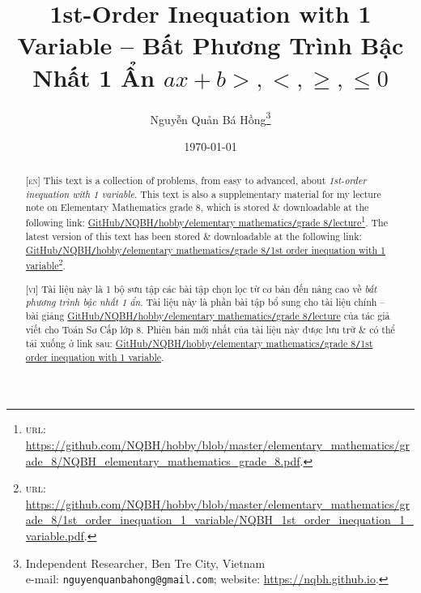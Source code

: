 \documentclass{article}
\title{1st-Order Inequation with 1 Variable -- Bất Phương Trình Bậc Nhất 1 Ẩn $ax + b >,<,\ge,\le0$}
\author{Nguyễn Quản Bá Hồng\footnote{Independent Researcher, Ben Tre City, Vietnam\\e-mail: \texttt{nguyenquanbahong@gmail.com}; website: \url{https://nqbh.github.io}.}}
\date{\today}
\begin{document}
\maketitle
\begin{abstract}
	\textsc{[en]} This text is a collection of problems, from easy to advanced, about \textit{1st-order inequation with 1 variable}. This text is also a supplementary material for my lecture note on Elementary Mathematics grade 8, which is stored \& downloadable at the following link: \href{https://github.com/NQBH/hobby/blob/master/elementary_mathematics/grade_8/NQBH_elementary_mathematics_grade_8.pdf}{GitHub\texttt{/}NQBH\texttt{/}hobby\texttt{/}elementary mathematics\texttt{/}grade 8\texttt{/}lecture}\footnote{\textsc{url}: \url{https://github.com/NQBH/hobby/blob/master/elementary_mathematics/grade_8/NQBH_elementary_mathematics_grade_8.pdf}.}. The latest version of this text has been stored \& downloadable at the following link: \href{https://github.com/NQBH/hobby/blob/master/elementary_mathematics/grade_8/1st_order_inequation_1_variable/NQBH_1st_order_inequation_1_variable.pdf}{GitHub\texttt{/}NQBH\texttt{/}hobby\texttt{/}elementary mathematics\texttt{/}grade 8\texttt{/}1st order inequation with 1 variable}\footnote{\textsc{url}: \url{https://github.com/NQBH/hobby/blob/master/elementary_mathematics/grade_8/1st_order_inequation_1_variable/NQBH_1st_order_inequation_1_variable.pdf}.}.
	\vspace{2mm}
	
	\textsc{[vi]} Tài liệu này là 1 bộ sưu tập các bài tập chọn lọc từ cơ bản đến nâng cao về \textit{bất phương trình bậc nhất 1 ẩn}. Tài liệu này là phần bài tập bổ sung cho tài liệu chính -- bài giảng \href{https://github.com/NQBH/hobby/blob/master/elementary_mathematics/grade_8/NQBH_elementary_mathematics_grade_8.pdf}{GitHub\texttt{/}NQBH\texttt{/}hobby\texttt{/}elementary mathematics\texttt{/}grade 8\texttt{/}lecture} của tác giả viết cho Toán Sơ Cấp lớp 8. Phiên bản mới nhất của tài liệu này được lưu trữ \& có thể tải xuống ở link sau: \href{https://github.com/NQBH/hobby/blob/master/elementary_mathematics/grade_8/1st_order_inequation_1_variable/NQBH_1st_order_inequation_1_variable.pdf}{GitHub\texttt{/}NQBH\texttt{/}hobby\texttt{/}elementary mathematics\texttt{/}grade 8\texttt{/}1st order inequation with 1 variable}.
\end{abstract}
\setcounter{secnumdepth}{4}
\setcounter{tocdepth}{3}
\tableofcontents
\newpage

\end{document}
